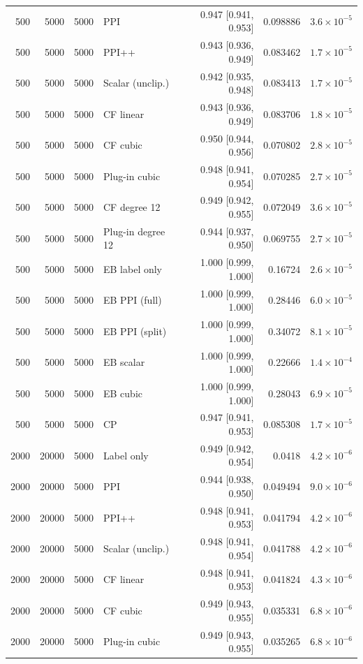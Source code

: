 {\begin{longtable}{rrrlrrr}
500 & 5000 & 5000 & PPI & 0.947 [0.941, 0.953] & 0.098886 & $3.6\times 10^{-5}$ \\
500 & 5000 & 5000 & PPI++ & 0.943 [0.936, 0.949] & 0.083462 & $1.7\times 10^{-5}$ \\
500 & 5000 & 5000 & Scalar (unclip.) & 0.942 [0.935, 0.948] & 0.083413 & $1.7\times 10^{-5}$ \\
500 & 5000 & 5000 & CF linear & 0.943 [0.936, 0.949] & 0.083706 & $1.8\times 10^{-5}$ \\
500 & 5000 & 5000 & CF cubic & 0.950 [0.944, 0.956] & 0.070802 & $2.8\times 10^{-5}$ \\
500 & 5000 & 5000 & Plug-in cubic & 0.948 [0.941, 0.954] & 0.070285 & $2.7\times 10^{-5}$ \\
500 & 5000 & 5000 & CF degree 12 & 0.949 [0.942, 0.955] & 0.072049 & $3.6\times 10^{-5}$ \\
500 & 5000 & 5000 & Plug-in degree 12 & 0.944 [0.937, 0.950] & 0.069755 & $2.7\times 10^{-5}$ \\
500 & 5000 & 5000 & EB label only & 1.000 [0.999, 1.000] & 0.16724 & $2.6\times 10^{-5}$ \\
500 & 5000 & 5000 & EB PPI (full) & 1.000 [0.999, 1.000] & 0.28446 & $6.0\times 10^{-5}$ \\
500 & 5000 & 5000 & EB PPI (split) & 1.000 [0.999, 1.000] & 0.34072 & $8.1\times 10^{-5}$ \\
500 & 5000 & 5000 & EB scalar & 1.000 [0.999, 1.000] & 0.22666 & $1.4\times 10^{-4}$ \\
500 & 5000 & 5000 & EB cubic & 1.000 [0.999, 1.000] & 0.28043 & $6.9\times 10^{-5}$ \\
500 & 5000 & 5000 & CP & 0.947 [0.941, 0.953] & 0.085308 & $1.7\times 10^{-5}$ \\
2000 & 20000 & 5000 & Label only & 0.949 [0.942, 0.954] & 0.0418 & $4.2\times 10^{-6}$ \\
2000 & 20000 & 5000 & PPI & 0.944 [0.938, 0.950] & 0.049494 & $9.0\times 10^{-6}$ \\
2000 & 20000 & 5000 & PPI++ & 0.948 [0.941, 0.953] & 0.041794 & $4.2\times 10^{-6}$ \\
2000 & 20000 & 5000 & Scalar (unclip.) & 0.948 [0.941, 0.954] & 0.041788 & $4.2\times 10^{-6}$ \\
2000 & 20000 & 5000 & CF linear & 0.948 [0.941, 0.953] & 0.041824 & $4.3\times 10^{-6}$ \\
2000 & 20000 & 5000 & CF cubic & 0.949 [0.943, 0.955] & 0.035331 & $6.8\times 10^{-6}$ \\
2000 & 20000 & 5000 & Plug-in cubic & 0.949 [0.943, 0.955] & 0.035265 & $6.8\times 10^{-6}$ \\

\end{longtable}}
